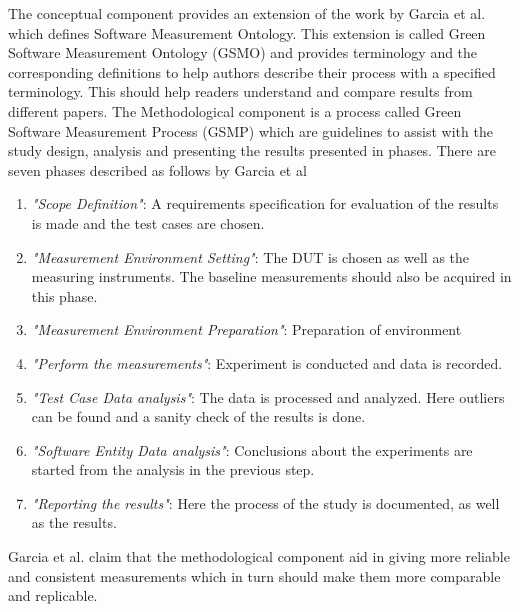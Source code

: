 The conceptual component provides an extension of the work by Garcia et al.\cite{GarciaSMO} which defines Software Measurement Ontology. This extension is called Green Software Measurement Ontology (GSMO) and provides terminology and the corresponding definitions to help authors describe their process with a specified terminology. This should help readers understand and compare results from different papers. The Methodological component is a process called Green Software Measurement Process (GSMP) which are guidelines to assist with the study design, analysis and presenting the results presented in phases. There are seven phases described as follows by Garcia et al\cite*{GarciaFEETINGS}
\begin{enumerate}
    \item \textit{"Scope Definition"}: A requirements specification for evaluation of the results is made and the test cases are chosen.
    \item \textit{"Measurement Environment Setting"}: The DUT is chosen as well as the measuring instruments. The baseline measurements should also be acquired in this phase.
    \item \textit{"Measurement Environment Preparation"}: Preparation of environment
    \item \textit{"Perform the measurements"}: Experiment is conducted and data is recorded. 
    \item \textit{"Test Case Data analysis"}: The data is processed and analyzed. Here outliers can be found and a sanity check of the results is done.
    \item \textit{"Software Entity Data analysis"}: Conclusions about the experiments are started from the analysis in the previous step.
    \item \textit{"Reporting the results"}: Here the process of the study is documented, as well as the results. 
\end{enumerate} 

Garcia et al.\cite*{GarciaFEETINGS} claim that the methodological component aid in giving more reliable and consistent measurements which in turn should make them more comparable and replicable. 

